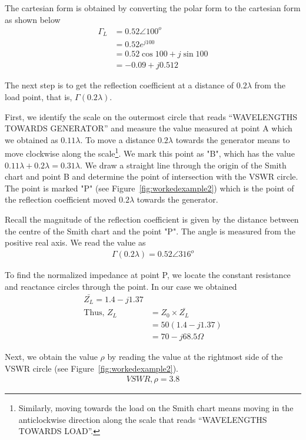 \begin{exmp}
The cartesian form is obtained by converting the polar form to the cartesian form as shown below
\begin{align*}
\Gamma_{L} &= 0.52\angle100^o\\
&= 0.52e^{j100}\\
&= 0.52{\cos100 + j\sin100}\\
&= -0.09+j0.512
\end{align*}

The next step is to get the reflection coefficient at a distance of $0.2\lambda$ from the load point, that is, $\Gamma(0.2\lambda)$. 

First, we identify the scale on the outermost circle that reads \textquotedblleft WAVELENGTHS TOWARDS GENERATOR\textquotedblright\; and measure the value measured at point A which we obtained as $0.11\lambda$. To move a distance $0.2\lambda$ towards the generator means to move clockwise along the scale\footnote{
Similarly, moving towards the load on the Smith chart means moving in the anticlockwise direction along the scale that reads \textquotedblleft WAVELENGTHS TOWARDS LOAD\textquotedblright.
}. We mark this point as "B", which has the value $0.11\lambda + 0.2\lambda=0.31\lambda$. We draw a straight line through the origin of the Smith chart and point B and determine the point of intersection with the VSWR circle. The point is marked "P" (see Figure~\ref{fig:workedexample2}) which is the point of the reflection coefficient moved $0.2\lambda$ towards the generator. 

Recall the magnitude of the reflection coefficient is given by the distance between the centre of the Smith chart and the point "P". The angle is measured from the positive real axis. We read the value as
\begin{align*}
\Gamma(0.2\lambda) = 0.52\angle316^o
\end{align*}

To find the normalized impedance at point P, we locate the constant resistance and reactance circles through the point. In our case we obtained
\begin{align*}
\bar{Z_L}=1.4-j1.37\\
\text{Thus, }Z_L &=Z_{0}\times\bar{Z_L}\\
&= 50(1.4-j1.37)\\
&= 70-j68.5\varOmega
\end{align*}

Next, we obtain the value $\rho$ by reading the value at the rightmost side of the VSWR circle (see Figure~\ref{fig:workedexample2}).
\begin{align*}
VSWR, \rho = 3.8
\end{align*}
\end{exmp}


